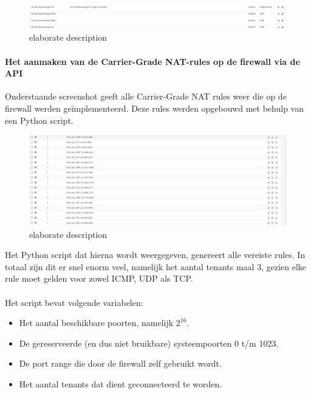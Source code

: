 \begin{figure}[!htbp]
    \includegraphics[width=\textwidth]{graphics/opnsense_tunables_portrange.PNG}
    \caption[OPNsense tunables portrange]{elaborate description}
    \label{fig:FirewallTunables}
\end{figure}

\paragraph{Het aanmaken van de Carrier-Grade NAT-rules op de firewall via de API}
Onderstaande screenshot geeft alle Carrier-Grade NAT rules weer die op de firewall werden geïmplementeerd. Deze rules werden opgebouwd met behulp van een Python script.

\begin{figure}[!htbp]
    \includegraphics[width=\textwidth]{graphics/opnsense_cgnat_rules.PNG}
    \caption[OPNsense met CGN regels]{elaborate description}
    \label{fig:FirewallCGNRules}
\end{figure}

Het Python script dat hierna wordt weergegeven, genereert alle vereiste rules. In totaal zijn dit er snel enorm veel, namelijk het aantal tenants maal 3, gezien elke rule moet gelden voor zowel ICMP, UDP als TCP.

\paragraph{}
Het script bevat volgende variabelen:

\begin{itemize}
    \item Het aantal beschikbare poorten, namelijk $2^{16}$.
    \item De gereserveerde (en dus niet bruikbare) systeempoorten 0 t/m 1023.
    \item De port range die door de firewall zelf gebruikt wordt.
    \item Het aantal tenants dat dient geconnecteerd te worden.
\end{itemize}

